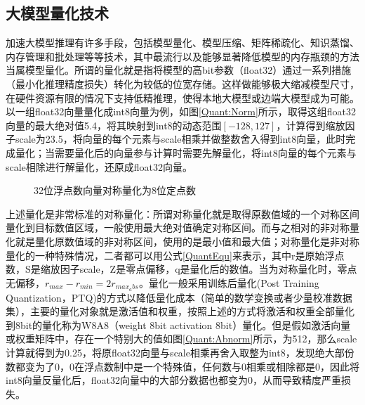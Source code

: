 \subsection{大模型量化技术}
加速大模型推理有许多手段，包括模型量化、模型压缩、矩阵稀疏化、知识蒸馏、内存管理和批处理等等技术\cite{LLMInferSurveyTsingHua}，其中最流行以及能够显著降低模型的内存瓶颈的方法当属模型量化。所谓的量化就是指将模型的高bit参数（float32）通过一系列措施（最小化推理精度损失）转化为较低的位宽存储。这样做能够极大缩减模型尺寸，在硬件资源有限的情况下支持低精推理，使得本地大模型或边端大模型成为可能。以一组float32向量量化成int8向量为例，如图\ref{Quant:Norm}所示，取得这组float32向量的最大绝对值5.4，将其映射到int8的动态范围$[-128,127]$，计算得到缩放因子scale为23.5，将向量的每个元素与scale相乘并做整数舍入得到int8向量，此时完成量化；当需要量化后的向量参与计算时需要先解量化，将int8向量的每个元素与scale相除进行解量化，还原成float32向量。

\begin{figure}[htbp!]
	\centering
    
	\label{Quant}
	\caption{32位浮点数向量对称量化为8位定点数}
\end{figure}

上述量化是非常标准的对称量化：所谓对称量化就是取得原数值域的一个对称区间量化到目标数值区域，一般使用最大绝对值确定对称区间。而与之相对的非对称量化就是量化原数值域的非对称区间，使用的是最小值和最大值；对称量化是非对称量化的一种特殊情况，二者都可以用公式\ref{QuantEqu}来表示，其中r是原始浮点数，S是缩放因子scale，Z是零点偏移，q是量化后的数值。当为对称量化时，零点无偏移，$r_{max}-r_{min}=2r_{max_abs}$。量化一般采用训练后量化(Post Training Quantization，PTQ)的方式以降低量化成本（简单的数学变换或者少量校准数据集），主要的量化对象就是激活值和权重，按照上述的方式将激活和权重全部量化到8bit的量化称为W8A8（weight 8bit activation 8bit）量化。但是假如激活向量或权重矩阵中，存在一个特别大的值如图\ref{Quant:Abnorm}所示，为512，那么scale计算就得到为0.25，将原float32向量与scale相乘再舍入取整为int8，发现绝大部份数都变为了0，0在浮点数制中是一个特殊值，任何数与0相乘或相除都是0，因此将int8向量反量化后，float32向量中的大部分数据也都变为0，从而导致精度严重损失。

